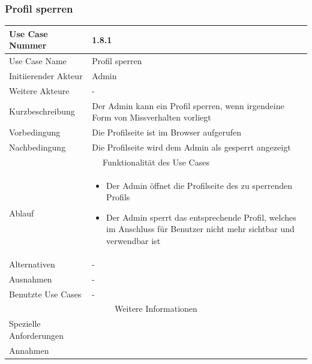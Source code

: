 \documentclass[10pt,a4paper]{article}
\begin{document}
			\subsubsection{Profil sperren}
		\begin{tabularx}{\textwidth}{|l|X|}
		\hline Use Case Nummer & 1.8.1 \\ 
		\hline Use Case Name & Profil sperren \\ 
		\hline Initiierender Akteur & Admin \\
		\hline Weitere Akteure & - \\
		\hline Kurzbeschreibung & Der Admin kann ein Profil sperren, wenn irgendeine Form von Missverhalten vorliegt \\
		\hline Vorbedingung & Die Profilseite ist im Browser aufgerufen \\
		\hline Nachbedingung & Die Profilseite wird dem Admin als gesperrt angezeigt \\
		\hline \multicolumn{2}{|c|}{Funktionalität des Use Cases}\\
		\hline Ablauf & \begin{itemize}
					\item Der Admin \"offnet die Profilseite des zu sperrenden Profils
					\item Der Admin sperrt das entsprechende Profil, welches im Anschluss f\"ur Benutzer nicht mehr sichtbar und verwendbar ist
				\end{itemize}\\
		\hline Alternativen & - \\
		\hline Ausnahmen & - \\
		\hline Benutzte Use Cases & - \\
		\hline \multicolumn{2}{|c|}{Weitere Informationen} \\
		\hline Spezielle Anforderungen &  \\
		\hline Annahmen &  \\
		\hline
		\end{tabularx}
		
\end{document}
